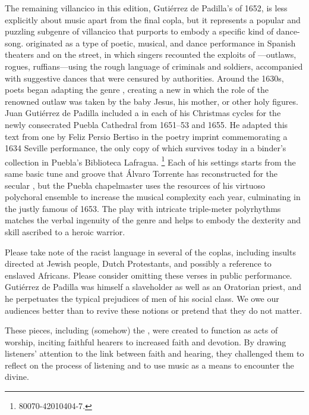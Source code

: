 The remaining villancico in this edition, Gutiérrez de Padilla's 
of 1652, is less explicitly about music apart from the final copla, but it
represents a popular and puzzling subgenre of villancico that purports to
embody a specific kind of dance-song.
 originated as a type of poetic, musical, and dance performance
in Spanish theaters and on the street, in which singers recounted the exploits
of ---outlaws, rogues, ruffians---using the rough language of
criminals and soldiers, accompanied with suggestive dances that were censured
by authorities.%
    \Autocite{Torrente:Jacara}
Around the 1630s, poets began adapting the genre , creating
a new  in which the role of the renowned outlaw
was taken by the baby Jesus, his mother, or other holy figures.
Juan Gutiérrez de Padilla included a  in each of his Christmas
cycles for the newly consecrated Puebla Cathedral from 1651--53 and 1655.
He adapted this text from one by Feliz Persio Bertiso in the poetry imprint
commemorating a 1634 Seville performance, the only copy of which survives
today in a binder's collection in Puebla's Biblioteca Lafragua.%
    \footnote{\signature{MEX-Plf}{80070-42010404-7}.}
Each of his settings starts from the same basic tune and groove that Álvaro
Torrente has reconstructed for the secular , but the Puebla
chapelmaster uses the resources of his virtuoso polychoral ensemble to
increase the musical complexity each year, culminating in the justly famous
 of 1653.
The play with intricate triple-meter polyrhythms matches the verbal ingenuity
of the genre and helps to embody the dexterity and skill ascribed to a 
heroic warrior.

Please take note of the racist language in several of the coplas, including
insults directed at Jewish people, Dutch Protestants, and possibly a reference
to enslaved Africans.
Please consider omitting these verses in public performance.
Gutiérrez de Padilla was himself a slaveholder as well as an Oratorian priest,
and he perpetuates the typical prejudices of men of his social class. 
We owe our audiences better than to revive these notions or pretend that they
do not matter.%
    \Autocite{Baker:PerformancePostColonial}

These pieces, including (somehow) the , were created to function
as acts of worship, inciting faithful hearers to increased faith and devotion.
By drawing listeners' attention to the link between faith and hearing, they
challenged them to reflect on the process of listening and to use music as a
means to encounter the divine.

